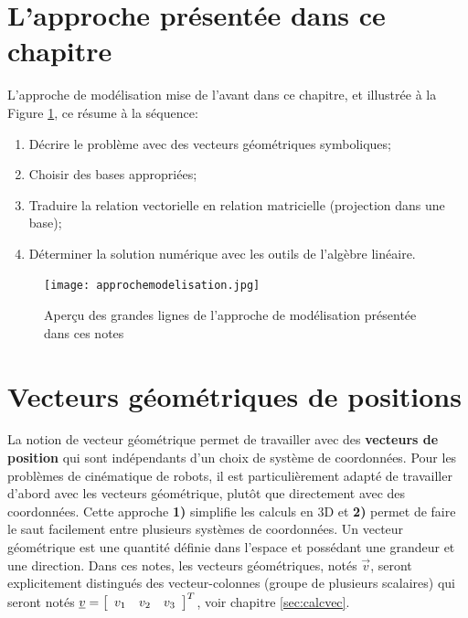 \section{L'approche présentée dans ce chapitre}

L'approche de modélisation mise de l'avant dans ce chapitre, et illustrée à la Figure \ref{fig:approchemodelisation}, ce résume à la séquence:
\begin{enumerate}
	\item Décrire le problème avec des vecteurs géométriques symboliques;
	\item Choisir des bases appropriées;
	\item Traduire la relation vectorielle en relation matricielle (projection dans une base);
	\item Déterminer la solution numérique avec les outils de l'algèbre linéaire.
\end{enumerate}
\begin{figure}[H]
	\centering
		\texttt{[image: approchemodelisation.jpg]}
	\caption{Aperçu des grandes lignes de l'approche de modélisation présentée dans ces notes}
	\label{fig:approchemodelisation}
\end{figure}
  



\newpage
\section{Vecteurs géométriques de positions}
\label{sec:vecgeopos}

La notion de vecteur géométrique permet de travailler avec des \textbf{vecteurs de position} qui sont indépendants d'un choix de système de coordonnées. Pour les problèmes de cinématique de robots, il est particulièrement adapté de travailler d'abord avec les vecteurs géométrique, plutôt que directement avec des coordonnées. Cette approche \textbf{1)} simplifie les calculs en 3D et \textbf{2)} permet de faire le saut facilement entre plusieurs systèmes de coordonnées. Un vecteur géométrique est une quantité définie dans l’espace et possédant une grandeur et une direction. Dans ces notes, les vecteurs géométriques, notés $\vec{v}$, seront explicitement distingués des vecteur-colonnes (groupe de plusieurs scalaires) qui seront notés $\underline{v}=\left[  \begin{array}{ccc} v_{1} & v_{2} & v_{3} \end{array} \right]^T$, voir chapitre \ref{sec:calcvec}.

